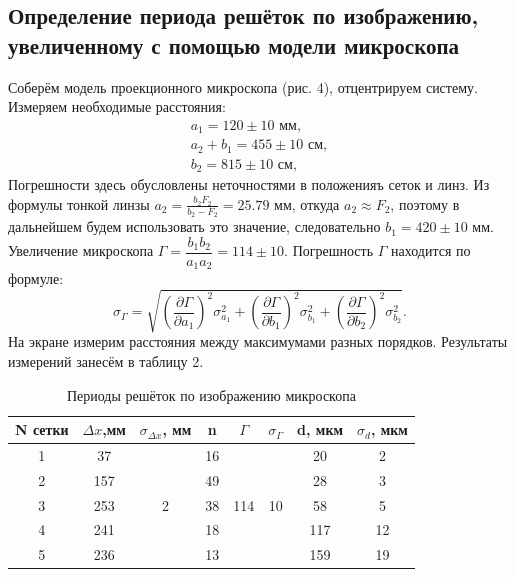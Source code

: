 \documentclass[a4paper,12pt]{report}
\begin{document}
\subsection*{Определение периода решёток по изображению, увеличенному
с помощью модели микроскопа}
    Соберём модель проекционного микроскопа (рис. 4), отцентрируем систему. Измеряем необходимые расстояния:
$$
\begin{array}{r}
a_1 = 120 \pm 10 \text{ мм},\\
a_2 + b_1 = 455 \pm 10 \text{  см},\\
b_2 = 815 \pm 10 \text{ см},
\end{array}
$$
Погрешности здесь обусловлены неточностями в положенияъ сеток и линз. Из формулы тонкой линзы $a_2 = \frac{b_2 F_2}{b_2 - F_2} = 25.79 \text{ мм}$, откуда $a_2 \approx F_2$, поэтому в дальнейшем будем использовать это значение, следовательно $b_1 = 420 \pm 10 \text{ мм}$. \\
Увеличение микроскопа $\Gamma = \dfrac{b_1 b_2}{a_1 a_2} = 114 \pm 10$. Погрешность $\Gamma$ находится по формуле:
$$
\sigma_\Gamma = \sqrt{\left(\dfrac{\partial \Gamma}{\partial a_1}\right)^2 \sigma^2_{a_1} + \left(\dfrac{\partial \Gamma}{\partial b_1}\right)^2 \sigma^2_{b_1} + \left(\dfrac{\partial \Gamma}{\partial b_2}\right)^2 \sigma^2_{b_2}}.
$$
    На экране измерим расстояния между максимумами разных порядков. Результаты измерений занесём в таблицу 2.
\begin{table}[h!]
  \centering
    \begin{center}
    \caption{Периоды решёток по изображению микроскопа}
    \end{center}
\begin{tabular}{|c|c|c|c|c|c|c|c|}
\hline
N сетки & $\Delta x$,мм & $\sigma_{\Delta x}$,   мм & n  & $\Gamma$               & $\sigma_\Gamma$         & d, мкм & $\sigma_{d}$, мкм \\ \hline
1       & 37         & \multirow{5}{*}{2}   & 16 & \multirow{5}{*}{114} & \multirow{5}{*}{10} & 20     & 2            \\ \cline{1-2} \cline{4-4} \cline{7-8} 
2       & 157        &                      & 49 &                      &                     & 28     & 3            \\ \cline{1-2} \cline{4-4} \cline{7-8} 
3       & 253        &                      & 38 &                      &                     & 58     & 5            \\ \cline{1-2} \cline{4-4} \cline{7-8} 
4       & 241        &                      & 18 &                      &                     & 117    & 12           \\ \cline{1-2} \cline{4-4} \cline{7-8} 
5       & 236        &                      & 13 &                      &                     & 159    & 19           \\ \hline
\end{tabular}
\end{table}    
\end{document}
